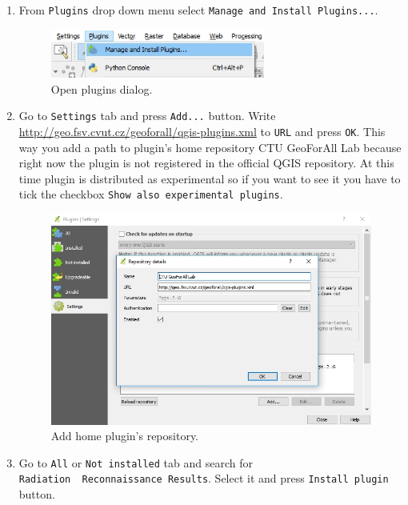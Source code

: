 \begin{enumerate}
\item{From \texttt{Plugins} drop down menu select
\texttt{Manage\ and\ Install\ Plugins...}.}

\begin{figure}[H]
    \centering
      \includegraphics[width=200pt]{./pictures/manage_install.jpg}
      \caption{Open plugins dialog.}
      \label{fig:manage}
\end{figure}

\item{Go to \texttt{Settings} tab and press \texttt{Add...} button. Write
\url{http://geo.fsv.cvut.cz/geoforall/qgis-plugins.xml} to \texttt{URL}
and press \texttt{OK}. This way you add a path to plugin's home
repository CTU GeoForAll Lab because right now the plugin is not
registered in the official QGIS repository. At this time plugin is
distributed as experimental so if you want to see it you have to tick
the checkbox \texttt{Show\ also\ experimental\ plugins}.}

\begin{figure}[H]
    \centering
      \includegraphics[width=400pt]{./pictures/home_repository.jpg}
      \caption{Add home plugin's repository.}
      \label{fig:repository}
\end{figure}

\item{Go to \texttt{All} or \texttt{Not\ installed} tab and search for
\texttt{Radiation\ \ Reconnaissance\ Results}. Select it and press
\texttt{Install\ plugin} button.}


\end{enumerate}
